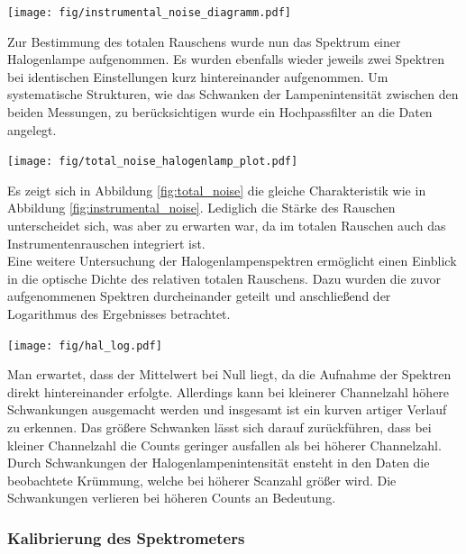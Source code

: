 \documentclass[12pt, a4paper, bibliography=totoc]{scrartcl}
\begin{document}
\begin{multicols}{2}
\begin{center}
	\texttt{[image: fig/instrumental\_noise\_diagramm.pdf]}
	\label{fig:instrumental_noise}
\end{center}  

Zur Bestimmung des totalen Rauschens wurde nun das Spektrum einer Halogenlampe aufgenommen.
Es wurden ebenfalls wieder jeweils zwei Spektren bei identischen Einstellungen kurz hintereinander aufgenommen. 
Um systematische Strukturen, wie das Schwanken der Lampenintensität zwischen den beiden Messungen, zu berücksichtigen wurde ein Hochpassfilter an die Daten angelegt.
\begin{center}
	\texttt{[image: fig/total\_noise\_halogenlamp\_plot.pdf]}
	\label{fig:total_noise}
\end{center}  

Es zeigt sich in Abbildung \ref{fig:total_noise} die gleiche Charakteristik wie in Abbildung \ref{fig:instrumental_noise}. Lediglich die Stärke des Rauschen unterscheidet sich, was aber zu erwarten war, da im totalen Rauschen auch das Instrumentenrauschen integriert ist.
\\
Eine weitere Untersuchung der Halogenlampenspektren ermöglicht einen Einblick in die optische Dichte des relativen totalen Rauschens. Dazu wurden die zuvor aufgenommenen Spektren durcheinander geteilt und anschließend der Logarithmus des Ergebnisses betrachtet.

\begin{center}
    \texttt{[image: fig/hal\_log.pdf]}
    \label{fig:hal_log}
\end{center}

Man erwartet, dass der Mittelwert bei Null liegt, da die Aufnahme der Spektren direkt hintereinander erfolgte. Allerdings kann bei kleinerer Channelzahl höhere Schwankungen ausgemacht werden und insgesamt ist ein kurven artiger Verlauf zu erkennen.
Das größere Schwanken lässt sich darauf zurückführen, dass bei kleiner Channelzahl die Counts geringer ausfallen als bei höherer Channelzahl.
Durch Schwankungen der Halogenlampenintensität ensteht in den Daten die beobachtete Krümmung, welche bei höherer Scanzahl größer wird. Die Schwankungen verlieren bei höheren Counts an Bedeutung.

\subsubsection{Kalibrierung des Spektrometers}\label{sssec:calibrating_the_spectrometer}


\end{multicols}
\end{document}
